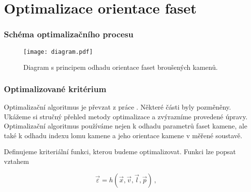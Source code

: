 \part{Optimalizace orientace faset}
	
\section{Schéma optimalizačního procesu}

%
%

\begin{figure} [h!]
\centering
\texttt{[image: diagram.pdf]}
\caption{Diagram s principem odhadu orientace faset broušených kamenů.}
\label{fig:diagram}
\end{figure}

\clearpage


\section{Optimalizované kritérium}
\label{sec:Optimalizace_crit}
Optimalizační algoritmus je převzat z práce \cite{Bodlak2005}. Některé části byly pozměněny. Ukážeme si stručný přehled metody optimalizace a zvýrazníme provedené úpravy. Optimalizační algoritmus používáme nejen k odhadu parametrů faset kamene, ale také k odhadu indexu lomu kamene a jeho orientace kamene v měřené soustavě.

Definujeme kriteriální funkci, kterou budeme optimalizovat. Funkci lze popsat vztahem 

\begin{equation}
\vec{\varepsilon} = h\left(\vec{x},\vec{v},\vec{l},\vec{p} \right)\,,
\label{eq: opt_criter}
\end{equation}

